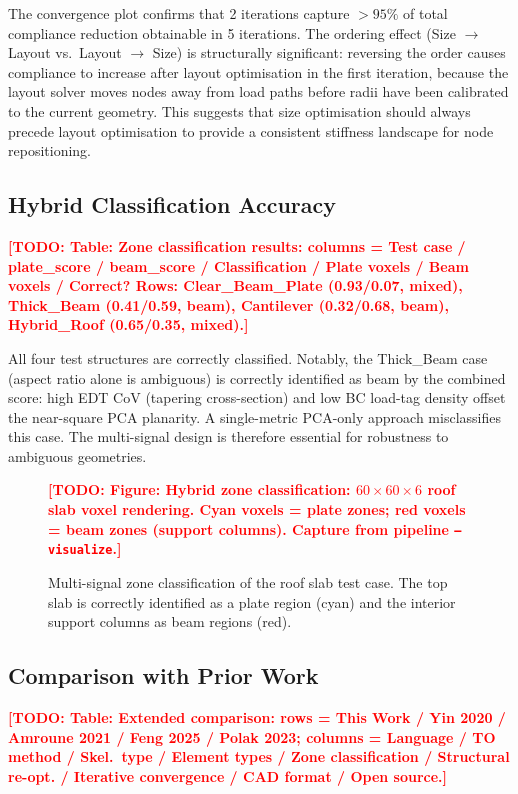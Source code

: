 \documentclass[11pt,a4paper]{article}
\newcommand{\TODO}[1]{\textcolor{red}{\textbf{[TODO: #1]}}}
\newcommand{\figstub}[2]{%
  \begin{figure}[htbp]\centering
    \TODO{Figure: #1}\caption{#2}\end{figure}}
\newcommand{\tblstub}[1]{\TODO{Table: #1}}
\begin{document}
The convergence plot confirms that 2 iterations capture $>95\%$ of total
compliance reduction obtainable in 5 iterations.
The ordering effect (Size $\to$ Layout vs.\ Layout $\to$ Size) is
structurally significant: reversing the order causes compliance to increase
after layout optimisation in the first iteration, because the layout solver
moves nodes away from load paths before radii have been calibrated to the
current geometry.
This suggests that size optimisation should always precede layout optimisation
to provide a consistent stiffness landscape for node repositioning.

\subsection{Hybrid Classification Accuracy}
\label{subsec:hybrid_results}

\tblstub{Zone classification results: columns = Test case / plate\_score /
  beam\_score / Classification / Plate voxels / Beam voxels / Correct?
  Rows: Clear\_Beam\_Plate (0.93/0.07, mixed), Thick\_Beam (0.41/0.59, beam),
  Cantilever (0.32/0.68, beam), Hybrid\_Roof (0.65/0.35, mixed).}

All four test structures are correctly classified.
Notably, the Thick\_Beam case (aspect ratio alone is ambiguous) is correctly
identified as beam by the combined score: high EDT CoV (tapering cross-section)
and low BC load-tag density offset the near-square PCA planarity.
A single-metric PCA-only approach misclassifies this case.
The multi-signal design is therefore essential for robustness to ambiguous
geometries.

\figstub{Hybrid zone classification: $60\times60\times6$ roof slab voxel
  rendering. Cyan voxels = plate zones; red voxels = beam zones (support
  columns). Capture from pipeline \texttt{--visualize}.}{
  Multi-signal zone classification of the roof slab test case.
  The top slab is correctly identified as a plate region (cyan) and the
  interior support columns as beam regions (red).}

\subsection{Comparison with Prior Work}
\label{subsec:comparison}

\tblstub{Extended comparison: rows = This Work / Yin 2020 / Amroune 2021 /
  Feng 2025 / Polak 2023; columns = Language / TO method / Skel.\ type /
  Element types / Zone classification / Structural re-opt. / Iterative
  convergence / CAD format / Open source.}
\end{document}
